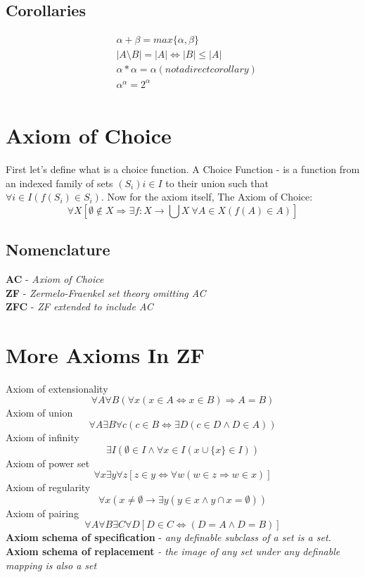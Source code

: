 \documentclass{article}
\begin{document}
\subsection{Corollaries}
\begin{align*}
&\alpha+\beta=max\{\alpha,\beta\} \\
&|A\setminus B|=|A| \iff |B|\le|A| \\
&\alpha*\alpha=\alpha (not a direct corollary) \\
&\alpha^\alpha=2^\alpha \\
\end{align*}
\section{Axiom of Choice}
First let's define what is a choice function. A Choice Function - is a function from an indexed family of sets $(S_i)i\in I$ to their union such that $\forall i\in I(f(S_i)\in S_i)$. Now for the axiom itself,
The Axiom of Choice:
\[
\forall X[\emptyset\notin X \Rightarrow \exists f:X\rightarrow\bigcup X \ \forall A\in X(f(A)\in A)]
\]

\subsection{Nomenclature}
    \textbf{AC} - \emph{Axiom of Choice}\\
    \textbf{ZF} - \emph{Zermelo-Fraenkel set theory omitting AC}\\
    \textbf{ZFC} - \emph{ZF extended to include AC}

\newpage
\section{More Axioms In ZF}
Axiom of extensionality
\[
	\forall A\forall B(\forall x(x\in A \iff x\in B)\Rightarrow A=B)
\]
Axiom of union
\[
	\forall A \exists B \forall c(c\in B \iff \exists D(c\in D \land D\in A))
\]
Axiom of infinity
\[
	\exists I(\emptyset \in I \land \forall x\in I (x\cup \{x\}\in I))
\]
Axiom of power set
\[
	\forall x \exists y \forall z[z\in y \iff \forall w(w\in z \Rightarrow w\in x)]
\]
Axiom of regularity
\[
	\forall x(x\neq\emptyset \rightarrow \exists y(y\in x \land y\cap x = \emptyset))
\]
Axiom of pairing
\[
	\forall A\forall B \exists C\forall D[D\in C \iff (D=A \land D=B)]
\]
\textbf{Axiom schema of specification} - \emph{any definable subclass of a set is a set.}
\textbf{Axiom schema of replacement} \emph{- the image of any set under any definable mapping is also a set}
\newpage
\end{document}

